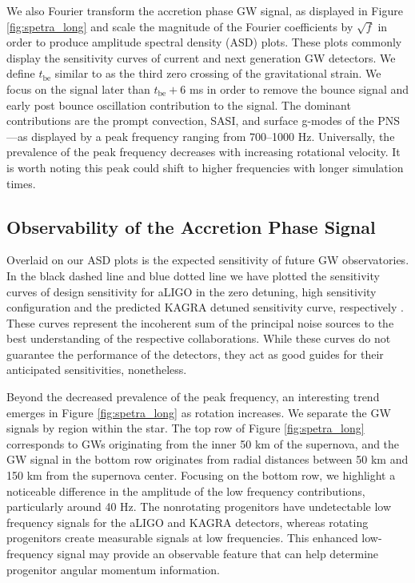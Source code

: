 \documentclass[twocolumn,times]{aastex62}  %
\begin{document}
We also Fourier transform the accretion phase GW signal, as displayed in Figure \ref{fig:spetra_long} and scale the magnitude of the Fourier coefficients by $\sqrt{f}$ in order to produce amplitude spectral density (ASD) plots.  These plots commonly display the sensitivity curves of current and next generation GW detectors.  We define $t_{\mathrm{be}}$ similar to \citet{richers:2017} as the third zero crossing of the gravitational strain.  We focus on the signal later than $t_{\mathrm{be}} + 6$ ms in order to remove the bounce signal and early post bounce oscillation contribution to the signal.  
The dominant contributions are the prompt convection, SASI, and surface g-modes of the PNS---as displayed by a peak frequency ranging from 700--1000 Hz.  Universally, the prevalence of the peak frequency decreases with increasing rotational velocity.  It is worth noting this peak could shift to higher frequencies with longer simulation times.

\subsection{Observability of the Accretion Phase Signal}

Overlaid on our ASD plots is the expected sensitivity of future GW observatories.  
In the black dashed line and blue dotted line we have plotted the sensitivity curves of design sensitivity for aLIGO in the zero detuning, high sensitivity configuration and the predicted KAGRA detuned sensitivity curve, respectively \citep{komari:2017,barsotti:2018}.
These curves represent the incoherent sum of the principal noise sources to the best understanding of the respective collaborations.  While these curves do not guarantee the performance of the detectors, they act as good guides for their anticipated sensitivities, nonetheless. 

Beyond the decreased prevalence of the peak frequency, an interesting trend emerges in Figure \ref{fig:spetra_long} as rotation increases.  
We separate the GW signals by region within the star.  The top row of Figure \ref{fig:spetra_long} corresponds to GWs originating from the inner 50 km of the supernova, and the GW signal in the bottom row originates from radial distances between 50 km and 150 km from the supernova center.
Focusing on the bottom row, we highlight a noticeable difference in the amplitude of the low frequency contributions, particularly around 40 Hz.  The nonrotating progenitors have undetectable low frequency signals for the aLIGO and KAGRA detectors, whereas rotating progenitors create measurable signals at low frequencies. 
This enhanced low-frequency signal may provide an observable feature that can help determine progenitor angular momentum information.  
\end{document}
